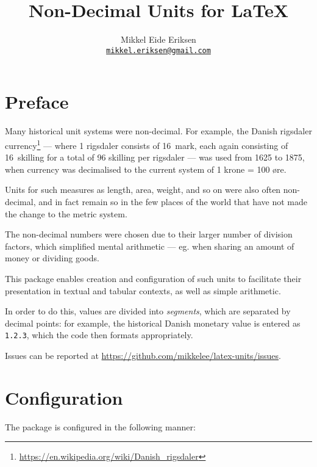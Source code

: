 \documentclass[
	a4paper,
]{article}
\title{Non-Decimal Units for \LaTeX}
\author{Mikkel Eide Eriksen\\\href{mailto:mikkel.eriksen@gmail.com}{\texttt{mikkel.eriksen@gmail.com}}}
\begin{document}
\maketitle

\section{Preface} %

Many historical unit systems were non-decimal. For example, the Danish rigsdaler currency\footnote{\url{https://en.wikipedia.org/wiki/Danish_rigsdaler}} --- where 1 rigsdaler consists of 16~mark, each again consisting of 16~skilling for a total of 96 skilling per rigsdaler --- was used from 1625 to 1875, when currency was decimalised to the current system of 1 krone = 100 øre.


Units for such measures as length, area, weight, and so on were also often non-decimal, and in fact remain so in the few places of the world that have not made the change to the metric system.

The non-decimal numbers were chosen due to their larger number of division factors, which simplified mental arithmetic --- eg. when sharing an amount of money or dividing goods.

This package enables creation and configuration of such units to facilitate their presentation in textual and tabular contexts, as well as simple arithmetic.

In order to do this, values are divided into \emph{segments}, which are separated by decimal points: for example, the historical Danish monetary value  is entered as \texttt{1.2.3}, which the code then formats appropriately.

Issues can be reported at \url{https://github.com/mikkelee/latex-units/issues}.

\clearpage
\section{Configuration} %

The package is configured in the following manner:
\end{document}
